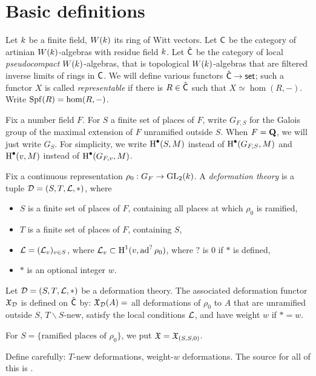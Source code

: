 \documentclass[phd,cornellheadings,draft]{cornell}
\begin{document}
\section{Basic definitions}

Let $k$ be a finite field, $W(k)$ its ring of Witt vectors. 
Let $\mathsf{C}$ be the category of artinian $W(k)$-algebras with residue field $k$. 
Let $\hat{\mathsf{C}}$ be the category of local \emph{pseudocompact} $W(k)$-algebras, that is topological $W(k)$-algebras that are filtered inverse limits of rings in $\mathsf{C}$. 
We will define various functors $\hat{\mathsf{C}}\to \mathsf{set}$; such a functor $X$ is called \emph{representable} if there is $R\in \hat{\mathsf{C}}$ such that $X\simeq \hom(R,-)$. 
Write $\operatorname{Spf}(R)=\hom(R,-)$. 

Fix a number field $F$. 
For $S$ a finite set of places of $F$, write $G_{F,S}$ for the Galois group of the maximal extension of $F$ unramified outside $S$. 
When $F=\mathbf{Q}$, we will just write $G_S$. For simplicity, we write 
$\operatorname{H}^\bullet(S,M)$ instead of $\operatorname{H}^\bullet(G_{F,S},M)$ and 
$\operatorname{H}^\bullet(v,M)$ instead of $\operatorname{H}^\bullet(G_{F,v},M)$. 

Fix a continuous representation $\rho_0:G_F\to \operatorname{GL}_2(k)$. A \emph{deformation theory} is a tuple $\mathcal{D}=(S,T,\mathcal{L},\ast)$, where 
\begin{itemize}
  \item $S$ is a finite set of places of $F$, containing all places at which $\rho_0$ is ramified, 
  \item $T$ is a finite set of places of $F$, containing $S$, 
  \item $\mathcal{L}=(\mathcal{L}_v)_{v\in S}$, where $\mathcal{L}_v\subset \operatorname{H}^1(v,\operatorname{ad}^?\rho_0)$, where $?$ is $0$ if $\ast$ is defined, 
  \item $\ast$ is an optional integer $w$. 
\end{itemize}

\begin{definition}
Let $\mathcal{D}=(S,T,\mathcal{L},\ast)$ be a deformation theory. 
The associated deformation functor $\mathfrak{X}_{\mathcal{D}}$ is defined on $\hat{\mathsf{C}}$ by: $\mathfrak{X}_{\mathcal{D}}(A)=$ all deformations of $\rho_0$ to $A$ that are unramified outside $S$, $T\smallsetminus S$-new, satisfy the local conditions $\mathcal{L}$, and have weight $w$ if $\ast=w$. 
\end{definition}

For $S=\{\text{ramified places of }\rho_0\}$, we put $\mathfrak{X}=\mathfrak{X}_{(S,S,0)}$. 

Define carefully: $T$-new deformations, weight-$w$ deformations. The source for 
all of this is \cite{mazur-1995}. 





\printbibliography
\end{document}
